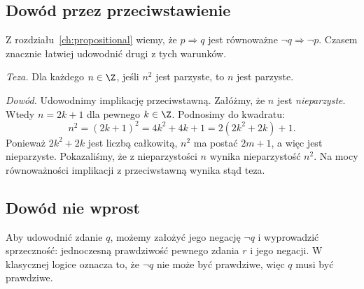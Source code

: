 \subsection{Dowód przez przeciwstawienie}\label{sec:contrapositive-proof}
Z rozdziału~\ref{ch:propositional} wiemy, że
$p\Rightarrow q$ jest równoważne
$\neg q\Rightarrow\neg p$. Czasem znacznie
łatwiej udowodnić drugi z tych warunków.

\begin{przyklad}
\label{ex:even-square}
\emph{Teza.} Dla każdego $n\in\Z$, jeśli $n^2$
jest parzyste, to $n$ jest parzyste.

\emph{Dowód.} Udowodnimy implikację przeciwstawną.
Załóżmy, że $n$ jest \emph{nieparzyste}. Wtedy
$n=2k+1$ dla pewnego $k\in\Z$. Podnosimy
do kwadratu:
\[
n^2=(2k+1)^2=4k^2+4k+1=2(2k^2+2k)+1.
\]
Ponieważ $2k^2+2k$ jest liczbą całkowitą,
$n^2$ ma postać $2m+1$, a więc jest nieparzyste.
Pokazaliśmy, że z nieparzystości $n$ wynika
nieparzystość $n^2$. Na mocy równoważności
implikacji z przeciwstawną wynika stąd teza.
\end{przyklad}

\subsection{Dowód nie wprost}\label{sec:contradiction-proof}
Aby udowodnić zdanie $q$, możemy założyć jego
negację $\neg q$ i wyprowadzić sprzeczność:
jednoczesną prawdziwość pewnego zdania $r$
i jego negacji. W klasycznej logice oznacza to,
że $\neg q$ nie może być prawdziwe, więc $q$
musi być prawdziwe.


